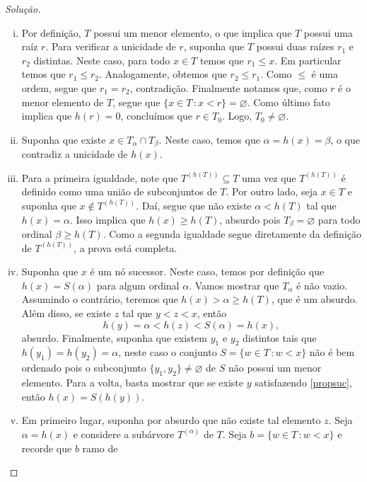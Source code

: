 \documentclass[a4paper]{article}
\theoremstyle{plain}\newtheorem{teo}{Teorema}[section]
\theoremstyle{plain}\newtheorem{prop}[teo]{Proposição}
\theoremstyle{plain}\newtheorem{lem}[teo]{Lema}
\theoremstyle{plain}\newtheorem{cor}[teo]{Corolário}
\theoremstyle{definition}\newtheorem{defi}[teo]{Definição}
\theoremstyle{remark}\newtheorem{rem}[teo]{Observação}
\theoremstyle{definition}\newtheorem{example}[teo]{Exemplo}
\theoremstyle{remark}\newtheorem{step}{\bf Step}
\begin{document}
\begin{proof}[Solução]\hfill
  \begin{enumerate}[(i)]
  \item Por definição, \(T\) possui um menor
    elemento, o que implica que \(T\) possui uma raíz \(r\). Para verificar a
    unicidade de \(r\), suponha que \(T\) possui duas raízes \(r_1\) e \(r_2\)
    distintas. Neste caso,  para todo \(x\in T\) temos que
    \(r_1\leq x\). Em particular temos que
    \(r_1\leq r_2\). Analogamente, obtemos que \(r_2\leq r_1\). Como \(\leq\) é
    uma ordem, segue que \(r_1=r_2\), contradição. Finalmente notamos que,
    como \(r\) é o menor elemento de \(T\), segue que \(\{x\in T\,\colon
    x<r\}=\varnothing\). Como último fato implica que \(h(r)=0\), concluímos que
    \(r\in T_0\). Logo, \(T_0\not=\varnothing\).
  \item Suponha que existe \(x\in T_\alpha\cap T_\beta\). Neste caso, temos que
    \(\alpha=h(x)=\beta\), o que contradiz a unicidade de \(h(x)\).
  \item Para a primeira igualdade, note que \(T^{(h(T))}\subseteq T\) uma vez
    que \(T^{(h(T))}\) é definido como uma união de subconjuntos de \(T\). Por
    outro lado, seja \(x\in T\) e suponha que \(x\not\in T^{(h(T))}\). Daí,
    segue que não existe \(\alpha < h(T)\) tal que \(h(x)=\alpha\). Isso implica
    que \(h(x)\geq h(T)\), absurdo pois \(T_\beta=\varnothing\) para todo
    ordinal \(\beta \geq h(T)\). Como a segunda igualdade segue diretamente da
    definição de \(T^{(h(T))}\), a prova está completa. 
  \item Suponha que \(x\) é um nó sucessor. Neste caso, temos por definição
    que \(h(x)=S(\alpha)\) para algum ordinal \(\alpha\). Vamos mostrar que
    \(T_\alpha\) é não vazio. Assumindo o contrário, teremos que
    \(h(x)>\alpha\geq h(T)\), que é um absurdo. Além disso,
    se  existe \(z\) tal que \(y<z<x\), então
    \[h(y)=\alpha<h(z)<S(\alpha)=h(x),\] absurdo. Finalmente, suponha que
    existem \(y_1\)
    e \(y_2\) distintos tais que \(h(y_1)=h(y_2)=\alpha\), neste caso o conjunto \(S=\{w\in
    T\,\colon w <x\}\) não é bem ordenado pois o subconjunto
    \(\{y_1,y_2\}\not = \varnothing\) de \(S\) não possui um menor elemento.
    Para a volta, basta mostrar que se existe \(y\) satisfazendo
    \eqref{propsuc}, então \(h(x)=S(h(y))\).
  \item Em primeiro lugar, suponha por absurdo que não existe tal elemento
    \(z\). Seja \(\alpha=h(x)\) e considere a subárvore \(T^{(\alpha)}\) de \(T\).
    Seja \(b=\{w \in T \,\colon w<x\}\) e recorde que \(b\) ramo de

\end{enumerate}
\end{proof}
\end{document}
